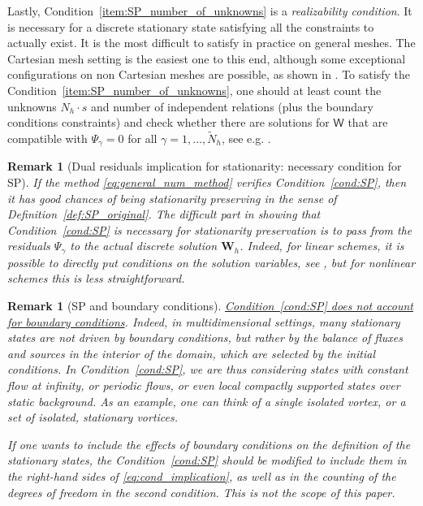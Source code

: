 \documentclass[a4paper,10pt]{article}
\newtheorem{remark}[theorem]{Remark}
\begin{document}
Lastly, Condition~\ref{item:SP_number_of_unknowns} is a \emph{realizability condition}. It is necessary for a discrete stationary state satisfying all the constraints to actually exist.
It is the most difficult to satisfy in practice on general meshes. The Cartesian mesh setting is 
the easiest one to this end, although some exceptional configurations on non Cartesian meshes are possible, as shown in \cite{Barsukow_nodeconservative2025}.
To satisfy the Condition~\ref{item:SP_number_of_unknowns}, one should at least count the unknowns $N_h \cdot s$ and number of independent relations (plus the boundary  conditions constraints) and check whether there are solutions for $\mathsf{W}$ that are compatible with $\Psi_\gamma = 0$ for all $\gamma=1,\dots, \tilde{N}_h$, see e.g. \cite{barsukow2025structure,Barsukow_nodeconservative2025,barsukow2025genuinely,barsukow2025stationaritypreservingnodalfinite}.

\begin{remark}[Dual residuals implication for stationarity: necessary condition for SP]\label{ram:SP}
If the method \eqref{eq:general_num_method} verifies Condition~\ref{cond:SP}, then it has good chances of being stationarity preserving in the sense of Definition~\ref{def:SP_original}.
The difficult part in showing that Condition~\ref{cond:SP} is necessary for stationarity preservation is to pass from the residuals $\Psi_\gamma$ to the actual discrete solution $\mathbf{W}_h$. Indeed, for linear schemes, it is possible to directly put conditions on the solution variables, see \cite{barsukow2025structure}, but for nonlinear schemes this is less straightforward.
\end{remark}

\begin{remark}[SP and boundary conditions] \label{rem:SPBCs} \underline{Condition~\ref{cond:SP}  does not account for   boundary conditions}.
  Indeed, in multidimensional settings, many stationary states are not driven by boundary conditions, but rather by the balance of fluxes and sources in the interior of the domain, which are selected by the initial conditions.
In Condition~\ref{cond:SP}, we are thus considering states with constant  flow at infinity, or  periodic flows, or even local compactly supported states  over static background.
As an example, one can think of  a single  isolated vortex, or a set of isolated,  stationary  vortices. 

If one wants to include the effects of boundary conditions on the definition of the stationary states, the Condition~\ref{cond:SP} should be modified to include them in the right-hand sides of \eqref{eq:cond_implication}, as well as in the counting of the degrees of freedom in the second condition.
This is not the scope of this paper.
\end{remark}
\end{document}
